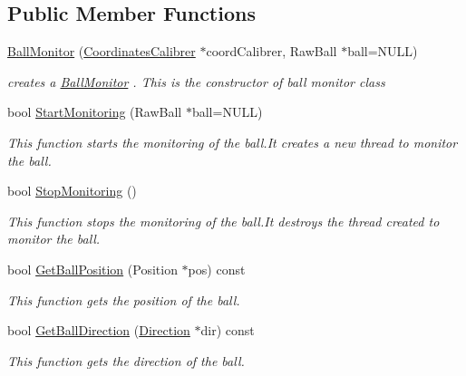 \subsection*{Public Member Functions}
\begin{DoxyCompactItemize}
\item 
\hyperlink{classBallMonitor_a176a257973eefa572b6972aa6b5a605d}{BallMonitor} (\hyperlink{classCoordinatesCalibrer}{CoordinatesCalibrer} $\ast$coordCalibrer, RawBall $\ast$ball=NULL)
\begin{DoxyCompactList}\small\item\em creates a \hyperlink{classBallMonitor}{BallMonitor} . This is the constructor of ball monitor class \item\end{DoxyCompactList}\item 
bool \hyperlink{classBallMonitor_a4d2b3aa764f5d4f4d5f58b7530565f90}{StartMonitoring} (RawBall $\ast$ball=NULL)
\begin{DoxyCompactList}\small\item\em This function starts the monitoring of the ball.It creates a new thread to monitor the ball. \item\end{DoxyCompactList}\item 
bool \hyperlink{classBallMonitor_af71db12abeb1f10f7be58eb7591910a3}{StopMonitoring} ()
\begin{DoxyCompactList}\small\item\em This function stops the monitoring of the ball.It destroys the thread created to monitor the ball. \item\end{DoxyCompactList}\item 
bool \hyperlink{classBallMonitor_aab81815271c442087c15bc8f6843d092}{GetBallPosition} (Position $\ast$pos) const 
\begin{DoxyCompactList}\small\item\em This function gets the position of the ball. \item\end{DoxyCompactList}\item 
bool \hyperlink{classBallMonitor_a3cd2fe1ed297c468634fbb390ca088bd}{GetBallDirection} (\hyperlink{structBallMonitor_1_1Direction}{Direction} $\ast$dir) const 
\begin{DoxyCompactList}\small\item\em This function gets the direction of the ball. \item\end{DoxyCompactList}\item 

\end{DoxyCompactItemize}
